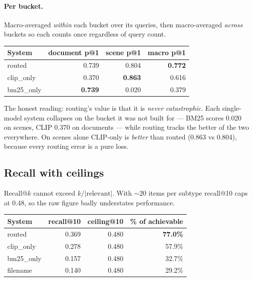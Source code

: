 \documentclass[11pt,a4paper]{article}
\newcommand{\best}[1]{\textbf{#1}}
\begin{document}
\paragraph{Per bucket.}
Macro-averaged \emph{within} each bucket over its queries, then macro-averaged
\emph{across} buckets so each counts once regardless of query count.

\begin{center}
\begin{tabular}{@{}lrrr@{}}
\toprule
\textbf{System} & \textbf{document p@1} & \textbf{scene p@1} & \textbf{macro p@1} \\
\midrule
routed     & 0.739 & 0.804 & \best{0.772} \\
clip\_only & 0.370 & \best{0.863} & 0.616 \\
bm25\_only & \best{0.739} & 0.020 & 0.379 \\
\bottomrule
\end{tabular}
\end{center}

The honest reading: routing's value is that it is \emph{never catastrophic}. Each
single-model system collapses on the bucket it was not built for --- BM25 scores
0.020 on scenes, CLIP 0.370 on documents --- while routing tracks the better of
the two everywhere. On scenes alone CLIP-only is \emph{better} than routed
(0.863 vs 0.804), because every routing error is a pure loss.

\subsection{Recall with ceilings}

Recall@$k$ cannot exceed $k/|\text{relevant}|$. With ${\sim}20$ items per subtype
recall@10 caps at 0.48, so the raw figure badly understates performance.

\begin{center}
\begin{tabular}{@{}lrrr@{}}
\toprule
\textbf{System} & \textbf{recall@10} & \textbf{ceiling@10} & \textbf{\% of achievable} \\
\midrule
routed     & 0.369 & 0.480 & \best{77.0\%} \\
clip\_only & 0.278 & 0.480 & 57.9\% \\
bm25\_only & 0.157 & 0.480 & 32.7\% \\
filename   & 0.140 & 0.480 & 29.2\% \\
\bottomrule
\end{tabular}
\end{center}
\end{document}
